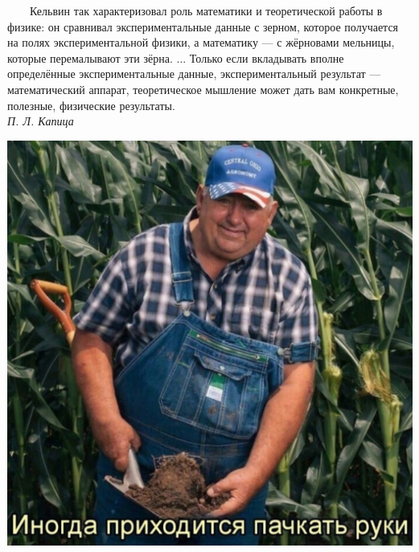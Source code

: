 \begin{minipage}{0.7\textwidth}
    \ \ \ \ Кельвин так характеризовал роль математики и теоретической работы в физике: он сравнивал 
    экспериментальные данные с зерном, которое получается на полях экспериментальной физики, а 
    математику — с жёрновами мельницы,
    которые перемалывают эти зёрна.  ... 
    Только если вкладывать вполне определённые экспериментальные данные, экспериментальный результат — математический аппарат, теоретическое мышление может дать вам конкретные, полезные, физические результаты.
    \\ 
    \phantom{42} \hfill \textit{П. Л. Капица}
\end{minipage}
\hfill
\begin{minipage}{0.2\textwidth}
    \centering
    \includegraphics[width=1\textwidth]{figures/preview.jpg}
\end{minipage}

\tableofcontents
\newpage


